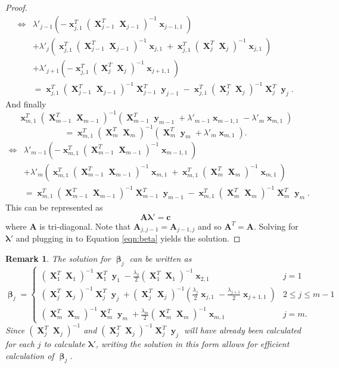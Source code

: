 \documentclass[12pt]{article}
\DeclareMathOperator{\bx}{\mathbf{x}}
\DeclareMathOperator{\bX}{\mathbf{X}}
\DeclareMathOperator{\by}{\mathbf{y}}
\DeclareMathOperator{\bbeta}{\boldsymbol{\beta}}
\newtheorem*{remark}{Remark}
\begin{document}
\begin{proof}
\begin{align*} 
\iff &  \lambda'_{j-1} \left(-\bx_{j,1}^T(\bX_{j-1}^T  \bX_{j-1})^{-1}\bx_{j-1, 1}\right) \\ 
& +  \lambda'_j \left(\bx_{j,1}^T(\bX_{j-1}^T  \bX_{j-1})^{-1}\bx_{j, 1}+\bx_{j,1}^T(\bX_j^T  \bX_j)^{-1}\bx_{j, 1}\right) \\
& +  \lambda'_{j+1}\left(-\bx_{j,1}^T(\bX_j^T  \bX_j)^{-1}\bx_{j+1, 1}\right) \\
& =\bx_{j,1}^T(\bX_{j-1}^T  \bX_{j-1})^{-1}\bX_{j-1}^T\by_{j-1}-\bx_{j,1}^T(\bX_j^T  \bX_j)^{-1} \bX_j^T \by_j.
\end{align*}
And finally
$$\bx_{m,1}^T(\bX_{m-1}^T  \bX_{m-1})^{-1}\left(\bX_{m-1}^T \by_{m-1} + \lambda'_{m-1}\bx_{m-1, 1}-\lambda'_{m}\bx_{m, 1}\right) $$
$$= \bx_{m,1}^T(\bX_m^T  \bX_m)^{-1} \left( \bX_m^T \by_m + \lambda'_{m}\bx_{m, 1} \right).$$
\begin{align*}
\iff & \lambda'_{m-1}\left(-\bx_{m,1}^T(\bX_{m-1}^T  \bX_{m-1})^{-1}\bx_{m-1, 1}\right) \\
& + \lambda'_m\left(\bx_{m,1}^T(\bX_{m-1}^T  \bX_{m-1})^{-1}\bx_{m, 1}+\bx_{m,1}^T(\bX_m^T \bX_m)^{-1}\bx_{m, 1} \right) \\
& = \bx_{m,1}^T(\bX_{m-1}^T  \bX_{m-1})^{-1}\bX_{m-1}^T \by_{m-1}-\bx_{m,1}^T(\bX_m^T \bX_m)^{-1}\bX_m^T\by_m.
\end{align*}
This can be represented as 
$$\mathbf{A} \boldsymbol{\lambda}'=\mathbf{c}$$
where $\mathbf{A}$ is tri-diagonal. Note that $\mathbf{A}_{j, j-1}=\mathbf{A}_{j-1,j}$ and so $\mathbf{A}^T=\mathbf{A}$. Solving for $\boldsymbol{\lambda}'$ and plugging in to Equation \ref{eqn:beta} yields the solution.
\end{proof}
\begin{remark}
The solution for $\bbeta_j$ can be written as
$$\bbeta_j=\begin{cases}
(\bX_1^T  \bX_1)^{-1}\bX_1^T \by_1 -\frac{\lambda_{2}}{2}(\bX_1^T  \bX_1)^{-1}\bx_{2, 1} & j=1 \\
(\bX_j^T  \bX_j)^{-1}\bX_j^T \by_j + (\bX_j^T  \bX_j)^{-1}(\frac{\lambda_j}{2}\bx_{j, 1}-\frac{\lambda_{j+1}}{2}\bx_{j+1, 1}) & 2 \leq j \leq m-1 \\
(\bX_m^T \bX_m)^{-1}\bX_m^T \by_m + \frac{\lambda_m}{2}(\bX_m^T \bX_m)^{-1}\bx_{m, 1} & j=m.
\end{cases}$$
Since $(\bX_j^T  \bX_j)^{-1}$ and $(\bX_j^T  \bX_j)^{-1}\bX_j^T \by_j$ will have already been calculated for each $j$ to calculate $\boldsymbol{\lambda}'$, writing the solution in this form allows for efficient calculation of $\bbeta_j$.
\end{remark}
\end{document}
